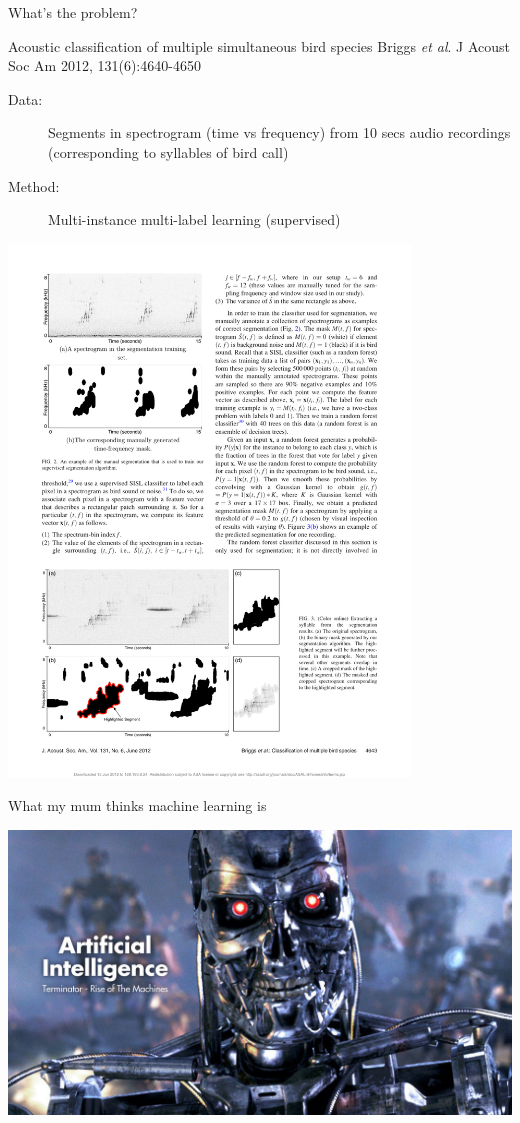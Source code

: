 \documentclass[pdf]{beamer}
\begin{document}
\begin{frame}{What's the problem?}
\begin{exampleblock}{Acoustic classification of multiple simultaneous bird species \vskip-1mm{\tiny Briggs \textit{et al}. J Acoust Soc Am 2012, 131(6):4640-4650}}
\begin{description}
	\item[Data:] Segments in spectrogram (time vs frequency) from 10 secs audio recordings (corresponding to syllables of bird call)
	\item[Method:] Multi-instance multi-label learning (supervised)
\end{description}
\begin{center}
	\includegraphics[width=0.8\textwidth]{briggs.pdf}
\end{center}
\end{exampleblock}
\end{frame}
\begin{frame}{What my mum thinks machine learning is}
\begin{center}
	\includegraphics[width=\textwidth]{AI.jpg}
\end{center}
\end{frame}
\end{document}

